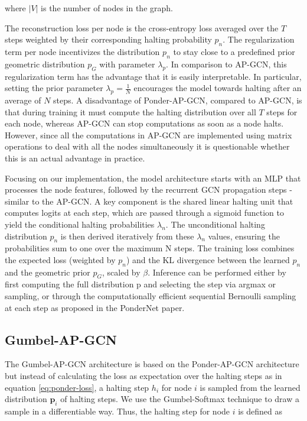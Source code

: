 \documentclass{gdl}
\begin{document}
\noindent where $|V|$ is the number of nodes in the graph.

\noindent The reconstruction loss per node is the cross-entropy loss averaged over the $T$ steps weighted by their corresponding halting probability $p_n$. The regularization term per node incentivizes the distribution $p_n$ to stay close to a predefined prior geometric distribution $p_G$ with parameter $\lambda_p$. In comparison to AP-GCN, this regularization term has the advantage that it is easily interpretable. In particular, setting the prior parameter $\lambda_p = \frac{1}{N}$ encourages the model towards halting after an average of $N$ steps. A disadvantage of Ponder-AP-GCN, compared to AP-GCN, is that during training it must compute the halting distribution over all $T$ steps for each node, whereas AP-GCN can stop computations as soon as a node halts. However, since all the computations in AP-GCN are implemented using matrix operations to deal with all the nodes simultaneously it is questionable whether this is an actual advantage in practice.

Focusing on our implementation, the model architecture starts with an MLP that processes the node features, followed by the recurrent GCN propagation steps - similar to the AP-GCN. A key component is the shared linear halting unit that computes logits at each step, which are passed through a sigmoid function to yield the conditional halting probabilities $\lambda_n$. The unconditional halting distribution $p_n$ is then derived iteratively from these $\lambda_n$  values, ensuring the probabilities sum to one over the maximum N steps. The training loss combines the expected loss (weighted by $p_n$) and the KL divergence between the learned $p_n$ and the geometric prior $p_G$, scaled by $\beta$. Inference can be performed either by first computing the full distribution p and selecting the step via argmax or sampling, or through the computationally efficient sequential Bernoulli sampling at each step as proposed in the PonderNet paper.

\subsection{Gumbel-AP-GCN}
The Gumbel-AP-GCN architecture is based on the Ponder-AP-GCN architecture but instead of calculating the loss as expectation over the halting steps as in equation \ref{eq:ponder-loss}, a halting step $h_i$ for node $i$ is sampled from the learned distribution $\mathbf{p}_i$ of halting steps. We use the Gumbel-Softmax technique \cite{Maddison2017, Jang2017} to draw a sample in a differentiable way. Thus, the halting step for node $i$ is defined as
\end{document}
